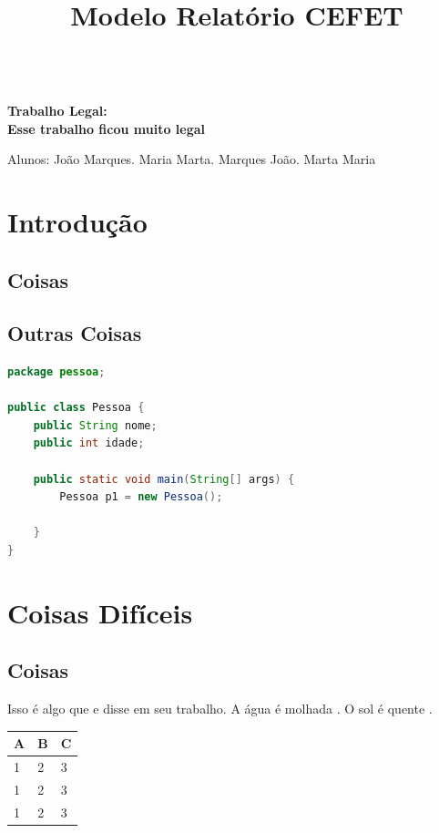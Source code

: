 \documentclass[12pt,a4paper]{article}
\newcommand{\CEFETtitulo}[1]{
\begin{center}
\begin{Large}
\textbf{\\#1\\}
\end{Large}
\end{center}
\vspace{.5cm}
}
\newcommand{\CEFETopen}{
    \selectlanguage{brazil}
    \pagestyle{otherpage}
    \thispagestyle{firstpage}
}
\begin{document}
	\title{Modelo Relatório CEFET}
	\CEFETopen
    
    \CEFETtitulo{Trabalho Legal:\\Esse trabalho ficou muito legal}
    Alunos: João Marques. Maria Marta. Marques João. Marta Maria


\section{Introdução}
\lipsum[1-2]
\subsection{Coisas}
\lipsum[1-2]

\vspace{.3cm}


\subsection{Outras Coisas}
\lipsum[1-2]

\begin{lstlisting}[language=Java, caption={},label={}]
package pessoa;

public class Pessoa {
    public String nome;
    public int idade;

    public static void main(String[] args) {
        Pessoa p1 = new Pessoa(); 
    
    }
}
\end{lstlisting}



\section{Coisas Difíceis}
\lipsum[1]
\subsection{Coisas}

Isso é algo que \citet{Liu2007494} e \citet{law} disse em seu trabalho. A água é molhada \citep{1987element}. O sol é quente \citep{1987element,Liu2007494,site_sparselib}.

\lipsum[1-2]


\begin{center}
\vspace{.3cm}
\begin{tabular}{|l|l|l|}
\hline
\textbf{A}&\textbf{B}&\textbf{C}\\ \hline \hline
1&2&3\\
1&2&3\\
1&2&3\\ \hline
\end{tabular}
\vspace{.3cm}
\end{center}
\end{document}
